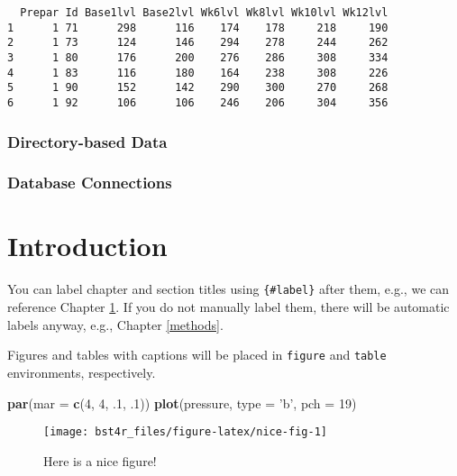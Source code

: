 \documentclass[]{book}
\newenvironment{Shaded}{\begin{snugshade}}{\end{snugshade}}
\newcommand{\KeywordTok}[1]{\textcolor[rgb]{0.13,0.29,0.53}{\textbf{#1}}}
\newcommand{\DataTypeTok}[1]{\textcolor[rgb]{0.13,0.29,0.53}{#1}}
\newcommand{\DecValTok}[1]{\textcolor[rgb]{0.00,0.00,0.81}{#1}}
\newcommand{\StringTok}[1]{\textcolor[rgb]{0.31,0.60,0.02}{#1}}
\newcommand{\NormalTok}[1]{#1}
\theoremstyle{definition}
\theoremstyle{definition}
\theoremstyle{definition}
\theoremstyle{remark}
\begin{document}
\begin{verbatim}
  Prepar Id Base1lvl Base2lvl Wk6lvl Wk8lvl Wk10lvl Wk12lvl
1      1 71      298      116    174    178     218     190
2      1 73      124      146    294    278     244     262
3      1 80      176      200    276    286     308     334
4      1 83      116      180    164    238     308     226
5      1 90      152      142    290    300     270     268
6      1 92      106      106    246    206     304     356
\end{verbatim}

\subsection{Directory-based Data}\label{directory-based-data}

\subsection{Database Connections}\label{database-connections}

\chapter{Introduction}\label{intro}

You can label chapter and section titles using \texttt{\{\#label\}}
after them, e.g., we can reference Chapter \ref{intro}. If you do not
manually label them, there will be automatic labels anyway, e.g.,
Chapter \ref{methods}.

Figures and tables with captions will be placed in \texttt{figure} and
\texttt{table} environments, respectively.

\begin{Shaded}
\begin{Highlighting}[]
\KeywordTok{par}\NormalTok{(}\DataTypeTok{mar =} \KeywordTok{c}\NormalTok{(}\DecValTok{4}\NormalTok{, }\DecValTok{4}\NormalTok{, .}\DecValTok{1}\NormalTok{, .}\DecValTok{1}\NormalTok{))}
\KeywordTok{plot}\NormalTok{(pressure, }\DataTypeTok{type =} \StringTok{'b'}\NormalTok{, }\DataTypeTok{pch =} \DecValTok{19}\NormalTok{)}
\end{Highlighting}
\end{Shaded}

\begin{figure}

{\centering \texttt{[image: bst4r\_files/figure-latex/nice-fig-1]} 

}

\caption{Here is a nice figure!}\label{fig:nice-fig}
\end{figure}
\end{document}
